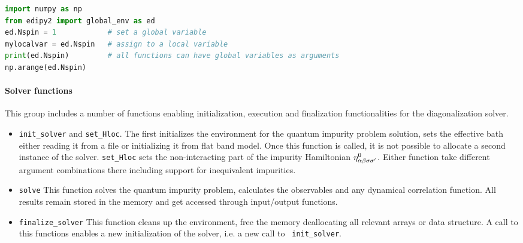 \documentclass[edipack2.tex]{subfiles}
\begin{document}
\begin{lstlisting}[language=python,  frame=lines]
import numpy as np
from edipy2 import global_env as ed
ed.Nspin = 1            # set a global variable
mylocalvar = ed.Nspin   # assign to a local variable
print(ed.Nspin)         # all functions can have global variables as arguments
np.arange(ed.Nspin)
\end{lstlisting}


\paragraph{{\bf Solver functions}}
This group includes a number of functions enabling initialization,
execution and finalization  functionalities for the diagonalization
solver.
\begin{itemize}
  \item {\tt init\_solver} and {\tt set\_Hloc}. The first 
    initializes the \NAME environment for the quantum impurity problem
    solution, sets the effective bath either reading it from a file or
    initializing it from flat band model. Once this function is
    called, it is not possible to allocate a second instance of the solver.
    {\tt set\_Hloc} sets the
    non-interacting part of the impurity Hamiltonian $\eta^0_{\alpha\beta\sigma\sigma'}$. 
    Either function take different argument combinations there
    including support for inequivalent impurities.

  \item {\tt solve} This function solves the quantum impurity problem,
    calculates the observables and any dynamical correlation
    function. All results remain stored in the memory and get accessed
    through input/output functions.

  \item {\tt finalize\_solver} This function cleans up the \NAME
    environment, free the memory deallocating all relevant arrays or
    data structure. A call to this functions enables a new
    initialization of the solver, i.e. a new call to {\tt
      init\_solver}.  
  \end{itemize}
\end{document}
